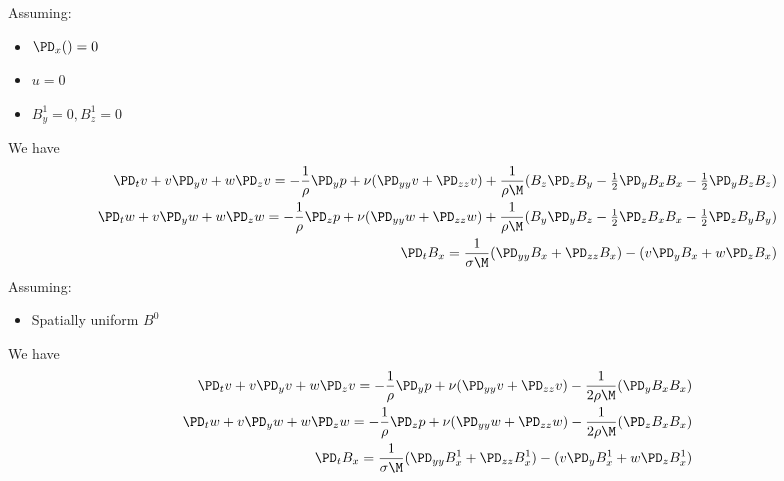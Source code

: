 \documentclass[11pt]{article}
\begin{document}
Assuming:
\begin{itemize}
\item $\PD_x () = 0$
\item $u = 0$
\item $B_y^1=0,B_z^1=0$
\end{itemize}
We have
\begin{equation}\begin{aligned}
\PD_t v+ v\PD_y v + w\PD_z v = -\frac{1}{\rho}\PD_y p+ \nu (\PD_{yy} v+\PD_{zz} v) + \frac{1}{\rho \M} (B_z \PD_z B_y-\tfrac{1}{2}\PD_y B_x B_x-\tfrac{1}{2}\PD_y B_z B_z) \\
\PD_t w+ v\PD_y w + w\PD_z w = -\frac{1}{\rho}\PD_z p+ \nu (\PD_{yy} w+\PD_{zz} w) + \frac{1}{\rho \M} (B_y \PD_y B_z-\tfrac{1}{2}\PD_z B_x B_x-\tfrac{1}{2}\PD_z B_y B_y) \\
\PD_t B_x = \frac{1}{\sigma \M} (\PD_{yy} B_x+\PD_{zz} B_x)                           - (v\PD_y B_x+w\PD_z B_x) \\
\end{aligned} \end{equation}
Assuming:
\begin{itemize}
\item Spatially uniform $B^0$
\end{itemize}
We have
\begin{equation}\begin{aligned}
\PD_t v+ v\PD_y v + w\PD_z v = -\frac{1}{\rho}\PD_y p+ \nu (\PD_{yy} v+\PD_{zz} v) - \frac{1}{2\rho \M} (\PD_y B_x B_x) \\
\PD_t w+ v\PD_y w + w\PD_z w = -\frac{1}{\rho}\PD_z p+ \nu (\PD_{yy} w+\PD_{zz} w) - \frac{1}{2\rho \M} (\PD_z B_x B_x) \\
\PD_t B_x = \frac{1}{\sigma \M} (\PD_{yy} B_x^1+\PD_{zz} B_x^1) - (v\PD_y B_x^1+w\PD_z B_x^1) \\
\end{aligned} \end{equation}
\end{document}
